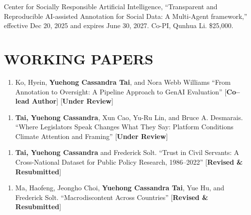 \documentclass[10.5pt,]{article}
\providecommand{\tightlist}{%
	\setlength{\itemsep}{0pt}\setlength{\parskip}{0pt}}
\renewenvironment{itemize}{
	\begin{list}{}{
			\setlength{\leftmargin}{1.5em}
		}
	}{
	\end{list}
}
\begin{document}
\begin{itemize}
\tightlist
\item
  Center for Socially Responsible Artificial Intelligence, ``Transparent
  and Reproducible AI-assisted Annotation for Social Data: A Multi-Agent
  framework,'' effective Dec 20, 2025 and expires June 30, 2027. Co-PI,
  Qunhua Li. \$25,000.
\end{itemize}

\section{WORKING PAPERS}\label{working-papers}

\begin{itemize}
\tightlist
\item
  \begin{enumerate}
  \def\labelenumi{\arabic{enumi}.}
  \setcounter{enumi}{3}
  \tightlist
  \item
    Ko, Hyein, \textbf{Yuehong Cassandra Tai}, and Nora Webb Williams
    ``From Annotation to Oversight: A Pipeline Approach to GenAI
    Evaluation'' {[}\textbf{Co--lead Author}{]} {[}\textbf{Under
    Review}{]}
  \end{enumerate}
\item
  \begin{enumerate}
  \def\labelenumi{\arabic{enumi}.}
  \setcounter{enumi}{2}
  \tightlist
  \item
    \textbf{Tai, Yuehong Cassandra}, Xun Cao, Yu-Ru Lin, and Bruce A.
    Desmarais. ``Where Legislators Speak Changes What They Say: Platform
    Conditions Climate Attention and Framing'' {[}\textbf{Under
    Review}{]}
  \end{enumerate}
\item
  \begin{enumerate}
  \def\labelenumi{\arabic{enumi}.}
  \setcounter{enumi}{1}
  \tightlist
  \item
    \textbf{Tai, Yuehong Cassandra} and Frederick Solt. ``Trust in Civil
    Servants: A Cross-National Dataset for Public Policy Research,
    1986--2022'' {[}\textbf{Revised \& Resubmitted}{]}
  \end{enumerate}
\item
  \begin{enumerate}
  \def\labelenumi{\arabic{enumi}.}
  \tightlist
  \item
    Ma, Haofeng, Jeongho Choi, \textbf{Yuehong Cassandra Tai}, Yue Hu,
    and Frederick Solt. ``Macrodiscontent Across Countries''
    {[}\textbf{Revised \& Resubmitted}{]}
  \end{enumerate}
\end{itemize}
\end{document}
